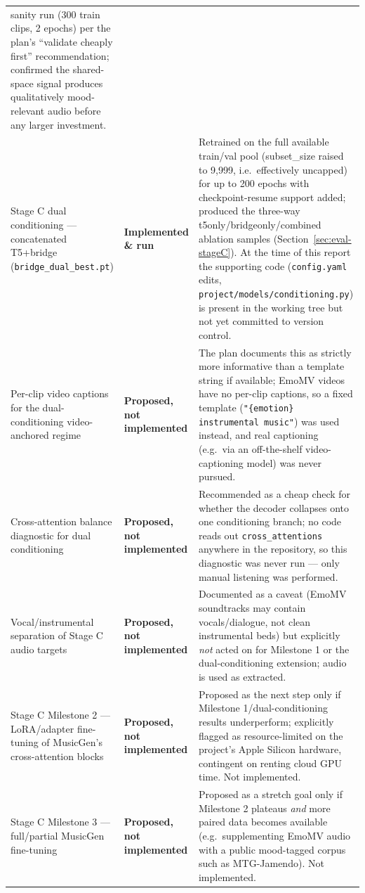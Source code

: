 \documentclass[11pt]{article}
\newcommand{\done}{\textcolor{green!45!black}{\textbf{Implemented \& run}}}
\newcommand{\future}{\textcolor{red!60!black}{\textbf{Proposed, not implemented}}}
\begin{document}
\begin{longtable}{@{}>{\raggedright\arraybackslash}p{3.4cm} >{\raggedright\arraybackslash}p{3.0cm} >{\raggedright\arraybackslash}p{8.3cm}@{}}
sanity run (300 train clips, 2 epochs) per the plan's ``validate cheaply first'' recommendation;
confirmed the shared-space signal produces qualitatively mood-relevant audio before any larger
investment. \\
\addlinespace
Stage C dual conditioning --- concatenated T5+bridge (\texttt{bridge\_dual\_best.pt}) & \done &
Retrained on the full available train/val pool (subset\_size raised to 9{,}999, i.e.\ effectively
uncapped) for up to 200 epochs with checkpoint-resume support added; produced the three-way
t5only/bridgeonly/combined ablation samples (Section~\ref{sec:eval-stageC}). At the time of this
report the supporting code (\texttt{config.yaml} edits, \texttt{project/models/conditioning.py})
is present in the working tree but not yet committed to version control. \\
\addlinespace
Per-clip video captions for the dual-conditioning video-anchored regime & \future & The plan
documents this as strictly more informative than a template string if available; EmoMV videos have
no per-clip captions, so a fixed template (\texttt{"\{emotion\} instrumental music"}) was used
instead, and real captioning (e.g.\ via an off-the-shelf video-captioning model) was never
pursued. \\
\addlinespace
Cross-attention balance diagnostic for dual conditioning & \future & Recommended as a cheap check
for whether the decoder collapses onto one conditioning branch; no code reads out
\texttt{cross\_attentions} anywhere in the repository, so this diagnostic was never run --- only
manual listening was performed. \\
\addlinespace
Vocal/instrumental separation of Stage C audio targets & \future & Documented as a caveat (EmoMV
soundtracks may contain vocals/dialogue, not clean instrumental beds) but explicitly \emph{not}
acted on for Milestone 1 or the dual-conditioning extension; audio is used as extracted. \\
\addlinespace
Stage C Milestone 2 --- LoRA/adapter fine-tuning of MusicGen's cross-attention blocks & \future &
Proposed as the next step only if Milestone 1/dual-conditioning results underperform; explicitly
flagged as resource-limited on the project's Apple Silicon hardware, contingent on renting cloud GPU
time. Not implemented. \\
\addlinespace
Stage C Milestone 3 --- full/partial MusicGen fine-tuning & \future & Proposed as a stretch goal
only if Milestone 2 plateaus \emph{and} more paired data becomes available (e.g.\ supplementing
EmoMV audio with a public mood-tagged corpus such as MTG-Jamendo). Not implemented. \\
\bottomrule
\end{longtable}
\end{document}
